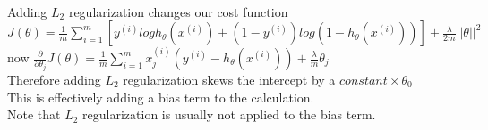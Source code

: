 \begin{answer}\\
Adding $L_2$ regularization changes our cost function\\
$J(\theta)=\frac{1}{m}\sum_{i=1}^{m}[y^{(i)}logh_{\theta}(x^{(i)})+(1-y^{(i)})log(1-h_{\theta}(x^{(i)}))] + \frac{\lambda}{2m}||\theta||^2$\\
now $\frac{\partial}{\partial \theta_j}J(\theta)=\frac{1}{m}\sum_{i=1}^{m}x_j^{(i)}(y^{(i)}-h_{\theta}(x^{(i)}))+\frac{\lambda}{m}\theta_j$\\
Therefore adding $L_2$ regularization skews the intercept by a $constant \times \theta_0$\\
This is effectively adding a bias term to the calculation.\\
Note that $L_2$ regularization is usually not applied to the bias term.
\end{answer}
